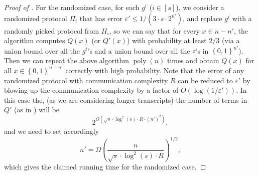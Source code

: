 \documentclass[10pt,a4paper]{article}
\newcommand{\bool}{\left\{0,1\right\}}
\newcommand{\poly}{\operatorname{poly}}
\begin{document}
\begin{proof}[Proof of ]
		For the randomized case, for each $g^i$ ($i\in[s]$), we consider a randomized protocol $\Pi_i$ that has error $\varepsilon'\leq 1/(3\cdot s\cdot2^{n'})$, and replace $g^i$ with a randomly picked protocol from $\Pi_i$, so we can say that for every $x\in{n-n'}$, the algorithm computes $Q(x)$ (or $Q'(x)$) with probability at least $2/3$ (via a union bound over all the $g^i$'s and a union bound over all the $z$'s in $\bool^{n'}$). Then we can repeat the above algorithm $\poly(n)$ times and obtain $Q(x)$ for all $x\in\bool^{n-n'}$ correctly with high probability. Note that the error of any randomized protocol with communication complexity $R$ can be reduced to $\varepsilon'$ by blowing up the communication complexity by a factor of $O(\log(1/\varepsilon'))$. In this case the, (as we are considering longer transcripts) the number of terms in $Q'$ (as in ) will be
		\[
		    2^{O(\sqrt{s}\cdot\log^2(s)\cdot R\cdot (n')^2)},
		\]
		and we need to set accordingly
		\[
		    n'=\Omega\left(\frac{n}{\sqrt{s}\cdot\log^2(s)\cdot R}\right)^{1/2},
		\]
		which gives the claimed running time for the randomized case.
	\end{proof}
\end{document}
